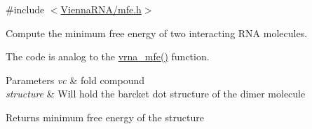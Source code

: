{\ttfamily \#include $<$\hyperlink{mfe_8h}{Vienna\+R\+N\+A/mfe.\+h}$>$}



Compute the minimum free energy of two interacting R\+N\+A molecules. 

The code is analog to the \hyperlink{group__mfe__fold_gabd3b147371ccf25c577f88bbbaf159fd}{vrna\+\_\+mfe()} function.


\begin{DoxyParams}{Parameters}
{\em vc} & fold compound \\
\hline
{\em structure} & Will hold the barcket dot structure of the dimer molecule \\
\hline
\end{DoxyParams}
\begin{DoxyReturn}{Returns}
minimum free energy of the structure 
\end{DoxyReturn}
